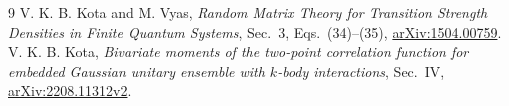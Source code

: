 \documentclass[11pt,a4paper]{article}
\begin{document}
\begin{thebibliography}{9}
 V. K. B. Kota and M. Vyas,
\emph{Random Matrix Theory for Transition Strength Densities in Finite
Quantum Systems}, Sec.~3, Eqs.~(34)--(35),
\href{https://arxiv.org/abs/1504.00759}{arXiv:1504.00759}.
 V. K. B. Kota,
\emph{Bivariate moments of the two-point correlation function for
embedded Gaussian unitary ensemble with $k$-body interactions},
Sec.~IV, \href{https://arxiv.org/abs/2208.11312}{arXiv:2208.11312v2}.
\end{thebibliography}
\end{document}
